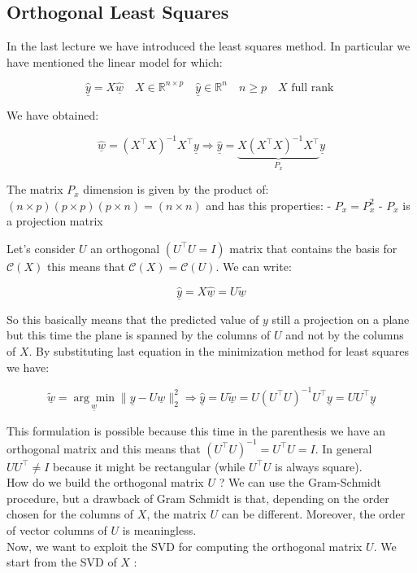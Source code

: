 
\newpage

\subsection*{Orthogonal Least Squares}
In the last lecture we have introduced the least squares method. In particular we have mentioned the linear model for which:

$$
\underline{\hat{y}}=X \underline{\hat{w}} \quad X \in \mathbb{R}^{n \times p} \quad \underline{\hat{y}} \in \mathbb{R}^{n} \quad n \geq p \quad X \text { full rank }
$$

We have obtained:

$$
\underline{\hat{w}}=\left(X^{\top} X\right)^{-1} X^{\top} \underline{y} \Longrightarrow \underline{\hat{y}}=\underbrace{X\left(X^{\top} X\right)^{-1} X^{\top}}_{P_{x}} \underline{y}
$$

The matrix $P_{x}$ dimension is given by the product of: $(n \times p)(p \times p)(p \times n)=(n \times n)$ and has this properties:
- $P_{x}=P_{x}^{2}$
- $P_{x}$ is a projection matrix

Let's consider $U$ an orthogonal $\left(U^{\top} U=I\right)$ matrix that contains the basis for $\mathcal{C}(X)$ this means that $\mathcal{C}(X)=\mathcal{C}(U)$. We can write:

$$
\underline{\hat{y}}=X \underline{\hat{w}}=U \underline{\tilde{w}}
$$

So this basically means that the predicted value of $y$ still a projection on a plane but this time the plane is spanned by the columns of $U$ and not by the columns of $X$. By substituting last equation in the minimization method for least squares we have:

$$
\underline{\tilde{w}}=\underset{\underline{w}}{\arg \min }\|\underline{y}-U \underline{w}\|_{2}^{2} \Longrightarrow \underline{\hat{y}}=U \underline{\tilde{w}}=U\left(U^{\top} U\right)^{-1} U^{\top} \underline{y}=U U^{\top} \underline{y}
$$

This formulation is possible because this time in the parenthesis we have an orthogonal matrix and this means that $\left(U^{\top} U\right)^{-1}=U^{\top} U=I$. In general $U U^{\top} \neq I$ because it might be rectangular (while $U^{\top} U$ is always square).\\ 
How do we build the orthogonal matrix $U$ ? We can use the Gram-Schmidt procedure, but a drawback of Gram Schmidt is that, depending on the order chosen for the columns of $X$, the matrix $U$ can be different. Moreover, the order of vector columns of $U$ is meaningless.\\
Now, we want to exploit the SVD for computing the orthogonal matrix $U$. We start from the SVD of $X$ :



